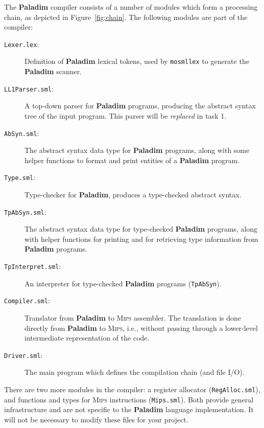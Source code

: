 \documentclass[12pt,a4paper]{article}
\newcommand{\paladim}{\textbf{Paladim}\xspace}
\newcommand{\mips}{\textsc{Mips}\xspace}
\begin{document}
The \paladim compiler consists of a number of modules which form a processing
chain, as depicted in Figure~\ref{fig:chain}. The following modules are part of
the compiler:

\begin{description}

\item[{\tt Lexer.lex}:] Definition of \paladim lexical tokens, used
    by \texttt{mosmllex} to generate the \paladim scanner.

\item[{\tt LL1Parser.sml}:] A top-down parser for \paladim programs,
    producing the abstract syntax tree of the input program.
    This parser will be \emph{replaced} in task 1.

\item[{\tt AbSyn.sml}:] The abstract syntax data type for \paladim programs,
       along with some helper functions to format and print entities of a
       \paladim program.

\item[{\tt Type.sml}:] Type-checker for \paladim, produces a type-checked
    abstract syntax.

\item[{\tt TpAbSyn.sml}:] The abstract syntax data type for type-checked
    \paladim programs, along with helper functions for printing and for
    retrieving type information from \paladim programs.

\item[{\tt TpInterpret.sml}:] An interpreter for type-checked \paladim
    programs (\texttt{TpAbSyn}).

\item[{\tt Compiler.sml}:] Translator from \paladim to \mips assembler.
    The translation is done directly from \paladim to \mips, i.e., without
        passing through a lower-level intermediate representation of the code.

\item[{\tt Driver.sml}:] The main program which defines the compilation chain
    (and file I/O).

\end{description}

\noindent
There are two more modules in the compiler: a register allocator
(\texttt{RegAlloc.sml}), and functions and types for \mips instructions
(\texttt{Mips.sml}). Both provide general infrastructure and are not specific
to the \paladim language implementation.
It will not be necessary to modify these files for your project.
\end{document}
